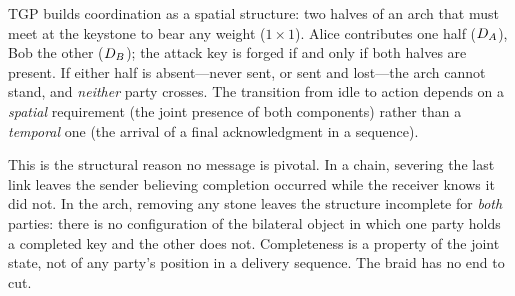 TGP builds coordination as a spatial structure: two halves of an arch that must meet at the keystone to bear any weight ($1 \times 1$). Alice contributes one half ($D_{A}$), Bob the other ($D_{B}$); the attack key is forged if and only if both halves are present. If either half is absent---never sent, or sent and lost---the arch cannot stand, and \emph{neither} party crosses. The transition from idle to action depends on a \emph{spatial} requirement (the joint presence of both components) rather than a \emph{temporal} one (the arrival of a final acknowledgment in a sequence).

This is the structural reason no message is pivotal. In a chain, severing the last link leaves the sender believing completion occurred while the receiver knows it did not. In the arch, removing any stone leaves the structure incomplete for \emph{both} parties: there is no configuration of the bilateral object in which one party holds a completed key and the other does not. Completeness is a property of the joint state, not of any party's position in a delivery sequence. The braid has no end to cut.

